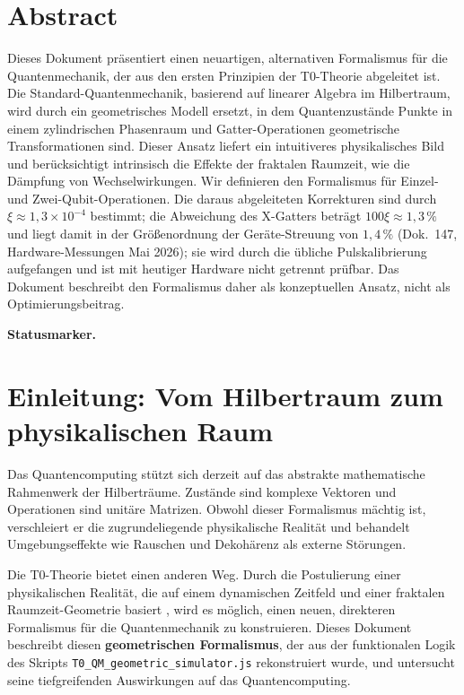 \section*{Abstract}

		Dieses Dokument präsentiert einen neuartigen, alternativen Formalismus für die Quantenmechanik, der aus den ersten Prinzipien der T0-Theorie abgeleitet ist. Die Standard-Quantenmechanik, basierend auf linearer Algebra im Hilbertraum, wird durch ein geometrisches Modell ersetzt, in dem Quantenzustände Punkte in einem zylindrischen Phasenraum und Gatter-Operationen geometrische Transformationen sind. Dieser Ansatz liefert ein intuitiveres physikalisches Bild und berücksichtigt intrinsisch die Effekte der fraktalen Raumzeit, wie die Dämpfung von Wechselwirkungen. Wir definieren den Formalismus für Einzel- und Zwei-Qubit-Operationen. Die daraus abgeleiteten Korrekturen sind durch $\xi \approx 1{,}3 \times 10^{-4}$ bestimmt; die Abweichung des X-Gatters beträgt $100\xi \approx 1{,}3\,\%$ und liegt damit in der Größenordnung der Geräte-Streuung von $1{,}4\,\%$ (Dok.~147, Hardware-Messungen Mai 2026); sie wird durch die übliche Pulskalibrierung aufgefangen und ist mit heutiger Hardware nicht getrennt prüfbar. Das Dokument beschreibt den Formalismus daher als konzeptuellen Ansatz, nicht als Optimierungsbeitrag.

	
	
\medskip\noindent\textbf{Statusmarker.}


	\section{Einleitung: Vom Hilbertraum zum physikalischen Raum}
	
	Das Quantencomputing stützt sich derzeit auf das abstrakte mathematische Rahmenwerk der Hilberträume. Zustände sind komplexe Vektoren und Operationen sind unitäre Matrizen. Obwohl dieser Formalismus mächtig ist, verschleiert er die zugrundeliegende physikalische Realität und behandelt Umgebungseffekte wie Rauschen und Dekohärenz als externe Störungen.
	
	Die T0-Theorie bietet einen anderen Weg. Durch die Postulierung einer physikalischen Realität, die auf einem dynamischen Zeitfeld und einer fraktalen Raumzeit-Geometrie basiert \cite{pascher:fundamentals}, wird es möglich, einen neuen, direkteren Formalismus für die Quantenmechanik zu konstruieren. Dieses Dokument beschreibt diesen \textbf{geometrischen Formalismus}, der aus der funktionalen Logik des Skripts \texttt{T0\_QM\_geometric\_simulator.js} rekonstruiert wurde, und untersucht seine tiefgreifenden Auswirkungen auf das Quantencomputing.
	
